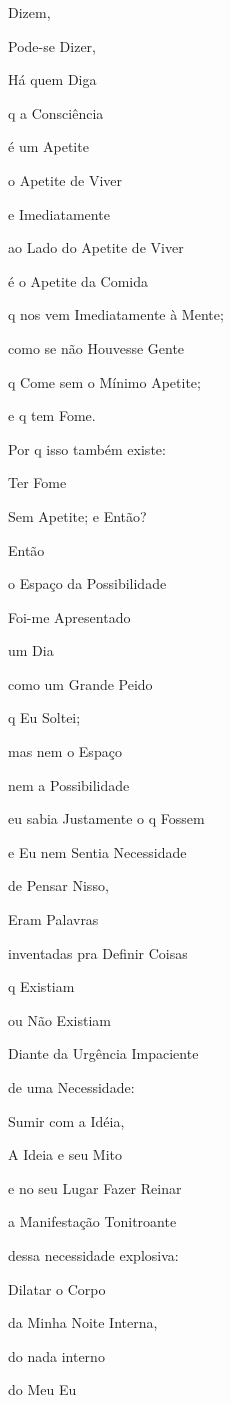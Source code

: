 Dizem, 

Pode-se Dizer, 

Há quem Diga

q a Consciência

é um Apetite

o Apetite de Viver

e Imediatamente

ao Lado do Apetite de Viver

é o Apetite da Comida

q nos vem Imediatamente à Mente;

como se não Houvesse Gente

q Come sem o Mínimo Apetite;

e q tem Fome.

Por q isso também existe:

Ter Fome

Sem Apetite; e Então?


Então

o Espaço da Possibilidade

Foi-me Apresentado

um Dia

como um Grande Peido

q Eu Soltei;

mas nem o Espaço

nem a Possibilidade

eu sabia Justamente o q Fossem

e Eu nem Sentia Necessidade

de Pensar Nisso,

Eram Palavras

inventadas pra Definir Coisas

q Existiam

ou Não Existiam

Diante da Urgência Impaciente

de uma Necessidade:

Sumir com a Idéia,

A Ideia e seu Mito

e no seu Lugar Fazer Reinar

a Manifestação Tonitroante

dessa necessidade explosiva:

Dilatar o Corpo

da Minha Noite Interna,

do nada interno

do Meu Eu

